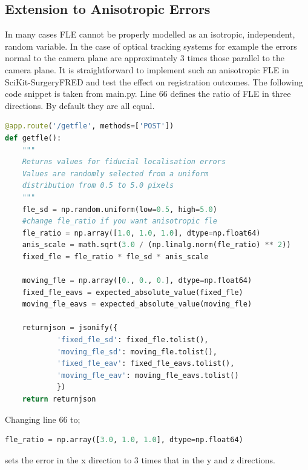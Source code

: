 \subsection{Extension to Anisotropic Errors}
\label{sec:anis_method}
In many cases {FLE} cannot be properly modelled as an isotropic, independent, random variable. In the case of optical tracking systems for example \cite{10.1117/12.536128} the errors normal to the camera plane are approximately 3 times those parallel to the camera plane. It is straightforward to implement such an anisotropic \gls{FLE} in SciKit-SurgeryFRED and test the effect on registration outcomes.
The following code snippet is taken from  main.py. Line 66 defines the ratio of \gls{FLE} in three directions. By default they are all equal.

\begin{lstlisting}[language=python, firstnumber = 57]
@app.route('/getfle', methods=['POST'])
def getfle():
    """
    Returns values for fiducial localisation errors
    Values are randomly selected from a uniform
    distribution from 0.5 to 5.0 pixels
    """
    fle_sd = np.random.uniform(low=0.5, high=5.0)
    #change fle_ratio if you want anisotropic fle
    fle_ratio = np.array([1.0, 1.0, 1.0], dtype=np.float64)
    anis_scale = math.sqrt(3.0 / (np.linalg.norm(fle_ratio) ** 2))
    fixed_fle = fle_ratio * fle_sd * anis_scale

    moving_fle = np.array([0., 0., 0.], dtype=np.float64)
    fixed_fle_eavs = expected_absolute_value(fixed_fle)
    moving_fle_eavs = expected_absolute_value(moving_fle)

    returnjson = jsonify({
            'fixed_fle_sd': fixed_fle.tolist(),
            'moving_fle_sd': moving_fle.tolist(),
            'fixed_fle_eav': fixed_fle_eavs.tolist(),
            'moving_fle_eav': moving_fle_eavs.tolist()
            })
    return returnjson
\end{lstlisting}

Changing line 66 to;
\begin{lstlisting}[language=python, firstnumber=66]
    fle_ratio = np.array([3.0, 1.0, 1.0], dtype=np.float64)
\end{lstlisting}
sets the error in the x direction to 3 times that in the y and z directions.  

